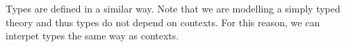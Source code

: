 
Types are defined in a similar way.
Note that we are modelling a simply typed theory and thus types do not depend on contexts.
For this reason, we can interpet types the same way as contexts.

\begin{code}%
\>[0]\AgdaSpace{}%
\AgdaSymbol{:}\AgdaSpace{}%
\AgdaSpace{}%
\AgdaSpace{}%
\<%
\\
\>[0]\AgdaSpace{}%
\AgdaSpace{}%
\AgdaSymbol{=}\AgdaSpace{}%
\<%
\\
\>[0]\AgdaSpace{}%
\AgdaSpace{}%
\AgdaSymbol{=}\AgdaSpace{}%
\<%
\end{code}



